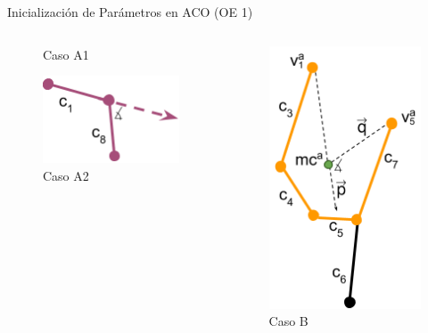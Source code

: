 \begin{frame}{Inicializaci\'on de Par\'ametros en ACO (OE 1)}
\begin{columns}
\begin{column}{0.25\textwidth}
\begin{figure}
                \caption{Caso A1}
            \end{figure}
            \vspace{0.1cm}
            \begin{figure}
                \includegraphics[scale=0.55]{Pictures/ant-params-2.png}
                \caption{Caso A2}
            \end{figure}
        \end{column}
        \begin{column}{0.25\textwidth}
            \begin{figure}
                 \centering
                 \includegraphics[scale=0.55]{Pictures/ant-params-3.png}
                 \caption{Caso B}
             \end{figure}
        \end{column}
    \end{columns}
\end{frame}

